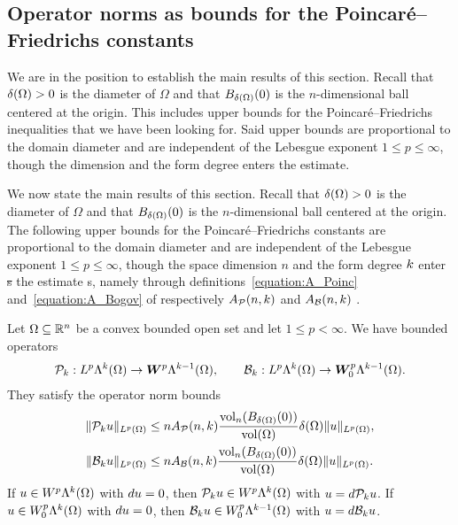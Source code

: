 \documentclass[10pt,letterpaper]{article}
\newcommand\cye[1]{%
\protect\leavevmode
\begingroup
    \color{red!35!yellow}%
    #1%
\endgroup
}
\newcommand{\mwl}[1]{{\color{red}#1}}
\begin{document}
\subsection{Operator norms as bounds for the Poincar\'e--Friedrichs constants}

\mwl{We are in the position to establish the main results of this section.
Recall that ${\delta}(\Omega) > 0$ is the diameter of $\Omega$ and that $B_{{\delta}(\Omega)}(0)$ is the $n$-dimensional ball centered at the origin.
This includes upper bounds for the Poincar\'e--Friedrichs inequalities that we have been looking for. 
Said upper bounds are proportional to the domain diameter and are independent of the Lebesgue exponent $1 \leq p \leq \infty$,
though the dimension and the form degree enters the estimate.}

We now state the main results of this section. \cye{Recall that ${\delta}(\Omega) > 0$ is the diameter of $\Omega$ and that $B_{{\delta}(\Omega)}(0)$ is the $n$-dimensional ball centered at the origin.} The \cye{following} upper bounds for the Poincar\'e--Friedrichs \cye{constants} \cye{are} proportional to the domain diameter and are independent of the Lebesgue exponent $1 \leq p \leq \infty$,
though the \cye{space} dimension \cye{$n$} and the form degree \cye{$k$} enter\cye{\sout{s}} the estimate\cye{s, namely through definitions~\eqref{equation:A_Poinc} and~\eqref{equation:A_Bogov} of respectively $A_{{\mathcal P}}(n,k)$ and $A_{{\mathcal B}}(n,k)$}. 


\begin{theorem}\label{theorem:PF_EC}
    Let $\Omega \subseteq {\mathbb R}^{n}$ be a convex bounded open set and let $1 \leq p < \infty$. 
    We have bounded operators 
    \begin{align*}
        {\mathcal P}_{k} : L^{p}\Lambda^{k}(\Omega) \rightarrow \bm{W}^{p}\Lambda^{k-1}(\Omega)
        ,
        \qquad 
        {\mathcal B}_{k} : L^{p}\Lambda^{k}(\Omega) \rightarrow \bm{W}^{p}_{0}\Lambda^{k-1}(\Omega)
        .
    \end{align*}
    They satisfy the operator norm bounds 
    \begin{align*}
        \| {\mathcal P}_{k} u \|_{L^{p}(\Omega)}
        &\leq 
        n A_{{\mathcal P}}(n,k) \frac{ \operatorname{vol}_{n}(B_{{\delta}(\Omega)}(0)) }{\operatorname{vol}(\Omega)} 
        {\delta}(\Omega)
        \| u \|_{L^{p}(\Omega)}
        ,
        \\
        \| {\mathcal B}_{k} u \|_{L^{p}(\Omega)}
        &\leq 
        n A_{{\mathcal B}}(n,k) \frac{ \operatorname{vol}_{n}(B_{{\delta}(\Omega)}(0)) }{\operatorname{vol}(\Omega)} 
        {\delta}(\Omega)
        \| u \|_{L^{p}(\Omega)}
        .
    \end{align*}
    If $u \in W^{p}    \Lambda^{k}(\Omega)$ with $d u = 0$, then ${\mathcal P}_{k} u \in W^{p}    \Lambda^{k  }(\Omega)$ with $u = d {\mathcal P}_{k} u$.
    If $u \in W^{p}_{0}\Lambda^{k}(\Omega)$ with $d u = 0$, then ${\mathcal B}_{k} u \in W^{p}_{0}\Lambda^{k-1}(\Omega)$ with $u = d {\mathcal B}_{k} u$.
\end{theorem}
\end{document}

